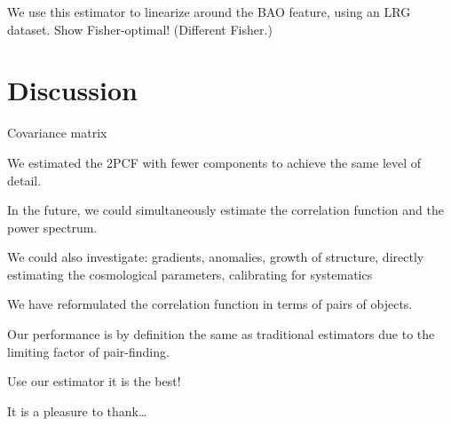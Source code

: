 \documentclass[modern]{aastex62}
\begin{document}
We use this estimator to linearize around the BAO feature, using an LRG dataset. Show Fisher-optimal! (Different Fisher.)

\section{Discussion}

Covariance matrix

We estimated the 2PCF with fewer components to achieve the same level of detail.

In the future, we could simultaneously estimate the correlation function and the power spectrum.

We could also investigate: gradients, anomalies, growth of structure, directly estimating the cosmological parameters, calibrating for systematics

We have reformulated the correlation function in terms of pairs of objects.

Our performance is by definition the same as traditional estimators due to the limiting factor of pair-finding.

Use our estimator it is the best!

\acknowledgements
It is a pleasure to thank\ldots
\end{document}
